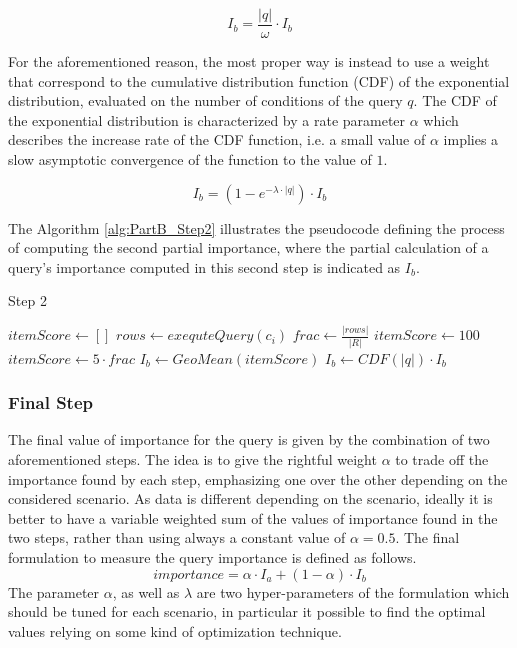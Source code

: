 \begin{equation}\label{eq:easy_w}
  I_b =  \frac{|q|}{\omega} \cdot I_b 
\end{equation}

For the aforementioned reason, the most proper way is instead to use a weight that correspond to the cumulative distribution function (CDF) of the exponential distribution, evaluated on the number of conditions of the query $q$. The CDF of the exponential distribution is characterized by a rate parameter $\alpha$ which describes the increase rate of the CDF function, i.e. a small value of $\alpha$ implies a slow asymptotic convergence of the function to the value of $1$.


\begin{equation}\label{eq:CDF_w}
    I_b = \left( 1 - e^{-\lambda \cdot \lvert q \lvert} \right) \cdot I_b 
\end{equation}

The Algorithm \ref{alg:PartB_Step2} illustrates the pseudocode defining the process of computing the second partial importance, where the partial calculation of a query's importance computed in this second step is indicated as $I_b$. 

\begin{algorithm}[h]
    \caption{Step 2} 
    \begin{algorithmic}[1]
        \State $itemScore \gets []$
           
            \State $rows \gets exequteQuery(c_i)$
            \State $frac \gets \frac{|rows|}{|R|}$
               \State $itemScore \gets 100$
            \Else
                \State $itemScore \gets 5 \cdot frac$
            \EndIf
        \EndFor
        \State $I_b \gets GeoMean(itemScore)$
        \State $I_b \gets CDF(|q|) \cdot I_b$
    \end{algorithmic} 
    \label{alg:PartB_Step2}
\end{algorithm}

\subsubsection{Final Step}
The final value of importance for the query is given by the combination of two aforementioned steps. The idea is to give the rightful weight $\alpha$ to trade off the importance found by each step, emphasizing one over the other depending on the considered scenario. As data is different depending on the scenario, ideally it is better to have a variable weighted sum of the values of importance found in the two steps, rather than using always a constant value of $\alpha = 0.5$.
The final formulation to measure the query importance is defined as follows.
\begin{equation}\label{eq:QueryUtility_final}
    importance = \alpha \cdot  I_a + (1-\alpha) \cdot I_b
\end{equation}
The parameter $\alpha$, as well as $\lambda$ are two hyper-parameters of the formulation which should be tuned for each scenario, in particular it possible to find the optimal values relying on some kind of optimization technique.